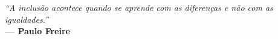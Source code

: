 
\renewcommand{\epigraphname}{EPÍGRAFE}

\begin{epigrafe}

    \textit{``A inclusão acontece quando se aprende com as diferenças e não com as igualdades.''}\\
    \textbf{— Paulo Freire}

\end{epigrafe}

